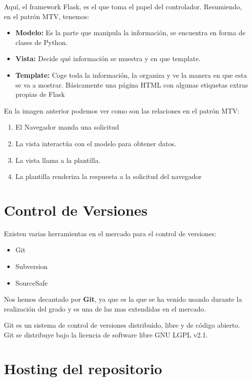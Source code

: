 Aquí, el framework Flask, es el que toma el papel del controlador.
Resumiendo, en el patrón MTV, tenemos:
\begin{itemize}
\item\textbf{Modelo:} Es la parte que manipula la información, se encuentra en forma de clases de Python.
\item\textbf{Vista:} Decide qué información se muestra y en que template.
\item\textbf{Template:} Coge toda la información, la organiza y ve la manera en que esta se va a mostrar. Básicamente una página HTML con algunas etiquetas extras propias de Flask
\end{itemize}


En la imagen anterior podemos ver como son las relaciones en el patrón MTV:
\begin{enumerate}
\item El Navegador manda una solicitud 
\item La vista interactúa con el modelo para obtener datos. 
\item La vista llama a la plantilla. 
\item La plantilla renderiza la respuesta a la solicitud del navegador 
\end{enumerate}

\section{Control de Versiones}

Existen varias herramientas en el mercado para el control de versiones:
\begin{itemize}
\item Git
\item Subversion
\item SourceSafe
\end{itemize}

Nos hemos decantado por \textbf {Git}, ya que es la que se ha venido usando durante la realización del grado y es una de las mas extendidas en el mercado.

Git es un sistema de control de versiones distribuido, libre y de código abierto. Git se distribuye bajo la licencia de software libre GNU LGPL v2.1. 

\section{Hosting del repositorio}

